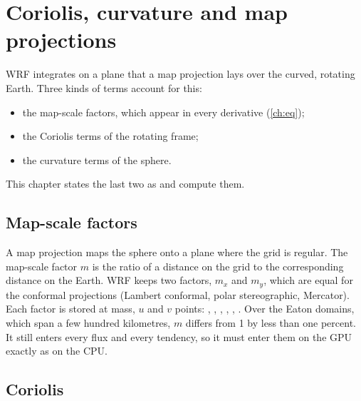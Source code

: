 \chapter{Coriolis, curvature and map projections}\label{ch:cor}

WRF integrates on a plane that a map projection lays over the curved, rotating Earth. Three kinds of terms account for
this:
\begin{itemize}
  \item the map-scale factors, which appear in every derivative (\cref{ch:eq});
  \item the Coriolis terms of the rotating frame;
  \item the curvature terms of the sphere.
\end{itemize}
This chapter states the last two as  and
 compute them.

\section{Map-scale factors}

A map projection maps the sphere onto a plane where the grid is regular. The map-scale factor $m$ is the ratio of a
distance on the grid to the corresponding distance on the Earth. WRF keeps two factors, $m_x$ and $m_y$, which are
equal for the conformal projections (Lambert conformal, polar stereographic, Mercator). Each factor is stored at
mass, $u$ and $v$ points: , , , , , . Over the
Eaton domains, which span a few hundred kilometres, $m$ differs from 1 by less than one percent. It still enters every
flux and every tendency, so it must enter them on the GPU exactly as on the CPU.

\section{Coriolis}

